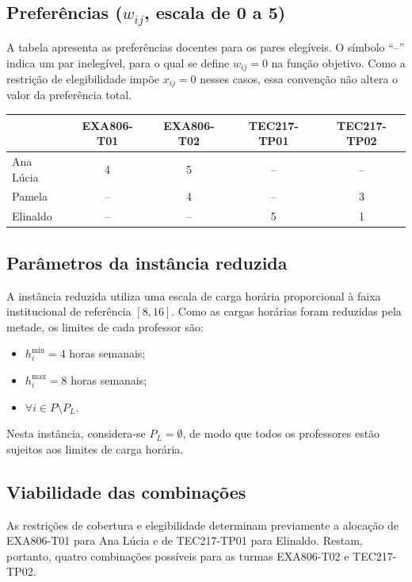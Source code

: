 \documentclass[11pt,a4paper]{article}
\begin{document}
\subsection{Preferências ($w_{ij}$, escala de 0 a 5)}

A tabela apresenta as preferências docentes para os pares elegíveis.
O símbolo ``--'' indica um par inelegível, para o qual se define
$w_{ij}=0$ na função objetivo. Como a restrição de elegibilidade
impõe $x_{ij}=0$ nesses casos, essa convenção não altera o valor
da preferência total.

\begin{center}
\small
\begin{tabular}{lcccc}
\toprule
 & EXA806-T01 & EXA806-T02 & TEC217-TP01 & TEC217-TP02 \\
\midrule
Ana Lúcia & 4 & 5 & -- & -- \\
Pamela    & -- & 4 & -- & 3 \\
Elinaldo  & -- & -- & 5 & 1 \\
\bottomrule
\end{tabular}
\end{center}

\subsection{Parâmetros da instância reduzida}

A instância reduzida utiliza uma escala de carga horária proporcional
à faixa institucional de referência $[8,16]$. Como as cargas horárias
foram reduzidas pela metade, os limites de cada professor são:

\begin{itemize}
    \item $h_i^{\min}=4$ horas semanais;
    \item $h_i^{\max}=8$ horas semanais;
    \item $\forall i\in P\setminus P_L$.
\end{itemize}

Nesta instância, considera-se $P_L=\emptyset$, de modo que todos os
professores estão sujeitos aos limites de carga horária.

\subsection{Viabilidade das combinações}

As restrições de cobertura e elegibilidade determinam previamente
a alocação de EXA806-T01 para Ana Lúcia e de TEC217-TP01 para
Elinaldo. Restam, portanto, quatro combinações possíveis para as
turmas EXA806-T02 e TEC217-TP02.
\end{document}
